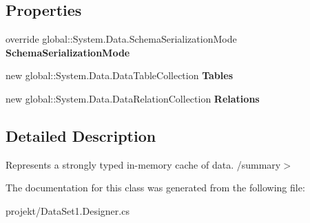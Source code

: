 \subsection*{Properties}
\begin{DoxyCompactItemize}
\item 
\mbox{\label{classprojekt_1_1_data_set1_a427450e2d66c48970331311264026734}} 
override global\+::\+System.\+Data.\+Schema\+Serialization\+Mode {\bfseries Schema\+Serialization\+Mode}
\item 
\mbox{\label{classprojekt_1_1_data_set1_a1991a0961ae830e41f424a830589a720}} 
new global\+::\+System.\+Data.\+Data\+Table\+Collection {\bfseries Tables}
\item 
\mbox{\label{classprojekt_1_1_data_set1_a6b93e786dcf82bd1c416e96311c865e2}} 
new global\+::\+System.\+Data.\+Data\+Relation\+Collection {\bfseries Relations}
\end{DoxyCompactItemize}


\subsection{Detailed Description}
Represents a strongly typed in-\/memory cache of data. /summary$>$ 

The documentation for this class was generated from the following file\+:\begin{DoxyCompactItemize}
\item 
projekt/Data\+Set1.\+Designer.\+cs\end{DoxyCompactItemize}
